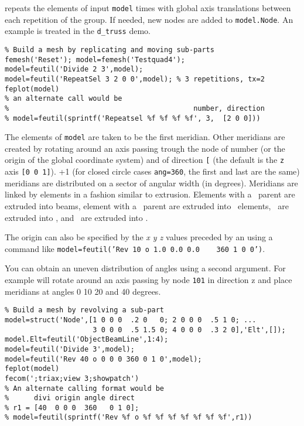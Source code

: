   repeats the elements of input {\tt model}  times with global axis translations  between each repetition of the group. If needed, new nodes are added to {\tt model.Node}. An example is treated in the {\tt d\_truss} demo. 

\begin{verbatim}
% Build a mesh by replicating and moving sub-parts
femesh('Reset'); model=femesh('Testquad4');
model=feutil('Divide 2 3',model); 
model=feutil('RepeatSel 3 2 0 0',model); % 3 repetitions, tx=2
feplot(model)
% an alternate call would be
%                                            number, direction
% model=feutil(sprintf('Repeatsel %f %f %f %f', 3,  [2 0 0]))
\end{verbatim}%


 The elements of {\tt model} are taken to be the first meridian. Other meridians are created by rotating around an axis passing trough the node of number  (or the origin of the global coordinate system) and of direction {\tt [}\tsi{nx ny nz}{\tt ]} (the default is the {\tt z} axis {\tt [0 0 1]}). +1 (for closed circle cases {\tt ang=360}, the first and last are the same) meridians are distributed on a sector of angular width  (in degrees). Meridians are linked by elements in a fashion similar to extrusion. Elements with a \mass\ parent are extruded into beams, element with a \beam\ parent are extruded into \quada\ elements, \quada\ are extruded into \hexah, and \quadb\ are extruded into \hexav.

The origin can also be specified by the {\sl x y z }values preceded by an  using a command like {\tt model=feutil('Rev 10 o 1.0 0.0 0.0 \ \ \ 360 1 0 0')}.

You can obtain an uneven distribution of angles using a second argument. For example  will rotate around an axis passing by node {\tt 101} in direction {\ti z} and place meridians at angles 0 10 20 and 40 degrees. 

\begin{verbatim}
% Build a mesh by revolving a sub-part
model=struct('Node',[1 0 0 0  .2 0   0; 2 0 0 0  .5 1 0; ...  
                     3 0 0 0  .5 1.5 0; 4 0 0 0  .3 2 0],'Elt',[]);
model.Elt=feutil('ObjectBeamLine',1:4);
model=feutil('Divide 3',model);
model=feutil('Rev 40 o 0 0 0 360 0 1 0',model);
feplot(model)
fecom(';triax;view 3;showpatch')
% An alternate calling format would be
%      divi origin angle direct
% r1 = [40  0 0 0  360   0 1 0];
% model=feutil(sprintf('Rev %f o %f %f %f %f %f %f %f',r1))
\end{verbatim}%



